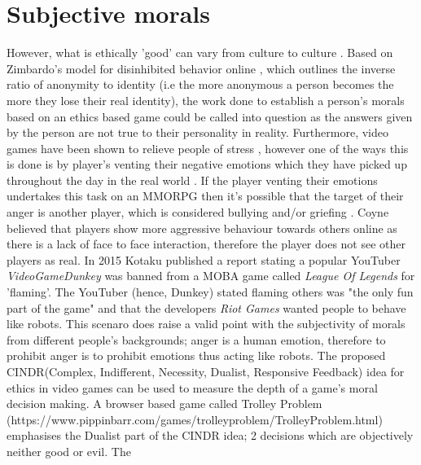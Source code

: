 \documentclass[12pt]{article}
\begin{document}
\section{Subjective morals}
However, what is ethically 'good' can vary from culture to culture \cite{7426669}. Based on Zimbardo's model for disinhibited behavior online \cite{Zim}, which outlines the inverse ratio of anonymity to identity (i.e the more anonymous a person becomes the more they lose their real identity), the work done to establish a person's morals based on an ethics based game could be called into question as the answers given by the person are not true to their personality in reality. Furthermore, video games have been shown to relieve people of stress \cite{7539750}, however one of the ways this is done is by player's venting their negative emotions which they have picked up throughout the day in the real world \cite{6701985}. If the player venting their emotions undertakes this task on an MMORPG then it's possible that the target of their anger is another player, which is considered bullying and/or griefing \cite{coyne2009griefing}. Coyne believed that players show more aggressive behaviour towards others online as there is a lack of face to face interaction, therefore the player does not see other players as real. In 2015 Kotaku \cite{hernandez_2015} published a report stating a popular YouTuber \textit{VideoGameDunkey} was banned from a MOBA game called \textit{League Of Legends} for 'flaming'. The YouTuber (hence, Dunkey) stated flaming others was "the only fun part of the game" and that the developers \textit{Riot Games} wanted people to behave like robots. This scenaro does raise a valid point with the subjectivity of morals from different people's backgrounds; anger is a human emotion, therefore to prohibit anger is to prohibit emotions thus acting like robots.
The proposed CINDR(Complex, Indifferent, Necessity, Dualist, Responsive Feedback)\cite{7048084} idea for ethics in video games can be used to measure the depth of a game's moral decision making. A browser based game called Trolley Problem (https://www.pippinbarr.com/games/trolleyproblem/TrolleyProblem.html) emphasises the Dualist part of the CINDR idea; 2 decisions which are objectively neither good or evil. The 
\end{document}
